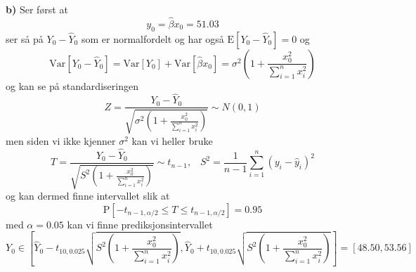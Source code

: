 \documentclass{report}
\newcommand{\nbrack}[1]{\left( #1 \right)}
\newcommand{\bbrack}[1]{\left[ #1 \right]}
\newcommand{\Var}[1]{\text{Var} \bbrack{ #1 }}
\newcommand{\fvv}[1]{\text{E} \bbrack{ #1 }}
\newcommand{\Prob}[1]{\text{P} \bbrack{ #1 }}
\begin{document}
\textbf{b)}
Ser først at
\begin{equation}
  \label{eq:52}
  y_{0} = \widehat{\beta}x_{0} = 51.03
\end{equation}
ser så på $Y_{0}-\widehat{Y}_{0}$ som er normalfordelt og har også $\fvv{ Y_{0} - \widehat{Y}_{0} } = 0$ og
\begin{equation}
  \label{eq:53}
  \Var{ Y_{0} - \widehat{Y}_{0} } = \Var{Y_{0}} + \Var{\widehat{\beta}x_{0}} = \sigma^{2} \nbrack{ 1 + \frac{x_{0}^{2}}{\sum_{i=1}^{n} x_{i}^{2}} }
\end{equation}
og kan se på standardiseringen
\begin{equation}
  \label{eq:54}
  Z = \frac{Y_{0} - \widehat{Y}_{0}}{\sqrt{ \sigma^{2}\nbrack{ 1 + \frac{x_{0}^{2}}{\sum_{i=1}^{n} x_{i}^{2}} } }} \sim N(0,1)
\end{equation}
men siden vi ikke kjenner $\sigma^{2}$ kan vi heller bruke
\begin{equation}
  \label{eq:55}
  T = \frac{Y_{0} - \widehat{Y}_{0}}{\sqrt{ S^{2}\nbrack{ 1 + \frac{x_{0}^{2}}{ \sum_{i=1}^{n} x_{i}^{2} } } }} \sim t_{n-1}, \;\;\; S^{2} = \frac{1}{n-1} \sum_{i=1}^{n} (y_{i} - \widehat{y}_{i})^{2}
\end{equation}
og kan dermed finne intervallet slik at
\begin{equation}
  \label{eq:56}
  \Prob{ -t_{n-1, \alpha/2} \leq T \leq t_{n-1, \alpha/2} } = 0.95
\end{equation}
med $\alpha = 0.05$ kan vi finne prediksjonsintervallet
\begin{equation}
  \label{eq:57}
  Y_{0} \in \bbrack{ \widehat{Y}_{0} - t_{10, 0.025} \sqrt{ S^{2} \nbrack{ 1 + \frac{x_{0}^{2}}{ \sum_{i=1}^{n} x_{i}^{2} } } }, \widehat{Y}_{0} + t_{10, 0.025} \sqrt{ S^{2} \nbrack{ 1 + \frac{x_{0}^{2}}{ \sum_{i=1}^{n} x_{i}^{2} } } } } = \bbrack{ 48.50, 53.56 }
\end{equation}
\end{document}
